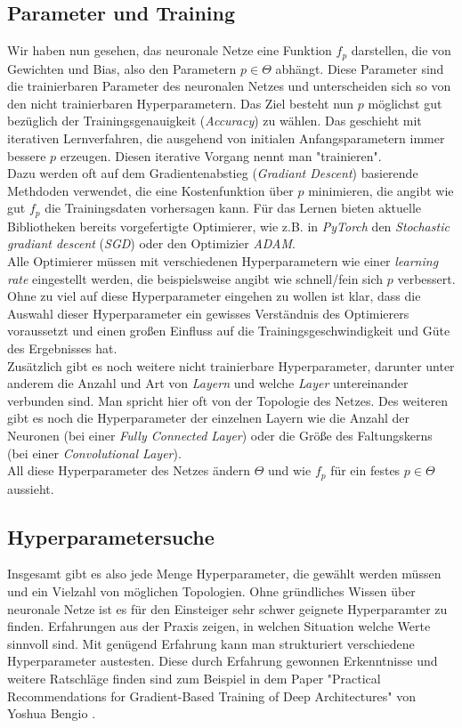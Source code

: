 \documentclass[]{scrartcl}
\begin{document}
	\subsection{Parameter und Training}\label{train}
		Wir haben nun gesehen, das neuronale Netze eine Funktion $f_p$ darstellen, die von Gewichten und Bias, also den Parametern $p \in \Theta$ abhängt.
		Diese Parameter sind die trainierbaren Parameter des neuronalen Netzes und unterscheiden sich so von den nicht trainierbaren Hyperparametern.
		Das Ziel besteht nun $p$ möglichst gut bezüglich der Trainingsgenauigkeit (\textit{Accuracy}) zu wählen. Das geschieht mit iterativen Lernverfahren, die ausgehend von initialen Anfangsparametern 
		immer bessere $p$ erzeugen. Diesen iterative Vorgang nennt man "trainieren". \\
		Dazu werden oft auf dem Gradientenabstieg (\textit{Gradiant Descent}) basierende Methdoden verwendet, die eine Kostenfunktion über $p$ minimieren,
		die angibt wie gut $f_p$ die Trainingsdaten vorhersagen kann. Für das Lernen bieten aktuelle Bibliotheken bereits vorgefertigte Optimierer, wie z.B.
		in \textit{PyTorch} den \textit{Stochastic gradiant descent} (\textit{SGD}) oder den Optimizier \textit{ADAM}. \\
		Alle Optimierer müssen mit verschiedenen Hyperparametern wie einer \textit{learning rate} eingestellt werden, die beispielsweise angibt wie schnell/fein sich $p$ verbessert. \\
		Ohne zu viel auf diese Hyperparameter eingehen zu wollen ist klar, dass die Auswahl dieser Hyperparameter ein gewisses Verständnis des Optimierers voraussetzt und einen
		großen Einfluss auf die Trainingsgeschwindigkeit und Güte des Ergebnisses hat. \\

		Zusätzlich gibt es noch weitere nicht trainierbare Hyperparameter, darunter unter anderem die Anzahl und Art von \textit{Layern} und welche \textit{Layer} untereinander verbunden sind.
		Man spricht hier oft von der Topologie des Netzes. Des weiteren gibt es noch die Hyperparameter der einzelnen Layern wie
		die Anzahl der Neuronen (bei einer \textit{Fully Connected Layer}) oder die Größe des Faltungskerns (bei einer \textit{Convolutional Layer}). \\
		All diese Hyperparameter des Netzes ändern $\Theta$ und wie $f_p$ für ein festes $p \in \Theta$ aussieht.
	
	\subsection{Hyperparametersuche}
		Insgesamt gibt es also jede Menge Hyperparameter, die gewählt werden müssen und ein Vielzahl von möglichen Topologien. Ohne gründliches Wissen über neuronale Netze
		ist es für den Einsteiger sehr schwer geignete Hyperparamter zu finden. Erfahrungen aus der Praxis zeigen, in welchen Situation welche Werte sinnvoll sind.
		Mit genügend Erfahrung kann man strukturiert verschiedene Hyperparameter austesten. Diese durch Erfahrung gewonnen Erkenntnisse und weitere Ratschläge finden sind zum Beispiel in dem Paper
		"Practical Recommendations for Gradient-Based Training of Deep Architectures" von Yoshua Bengio \cite{parameters}.\\
\end{document}
